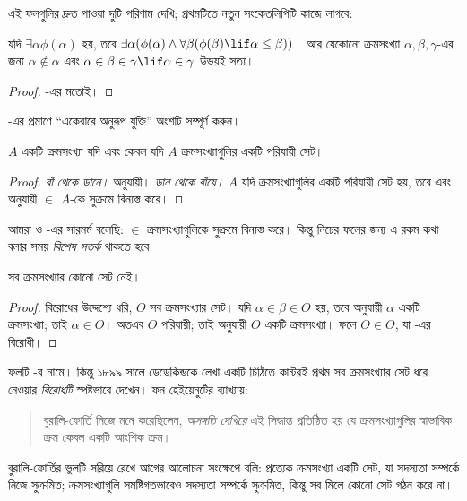 \documentclass[../../../include/open-logic-section]{subfiles}
\begin{document}
এই ফলগুলির দ্রুত পাওয়া দুটি পরিণাম দেখি;
প্রথমটিতে নতুন সংকেতলিপিটি কাজে লাগবে:

\begin{cor}
যদি $\exists \alpha\phi(\alpha)$ হয়, তবে
$\exists \alpha(\phi(\alpha)
\land \forall \beta(\phi(\beta) \lif \alpha \leq \beta))$।
আর যেকোনো ক্রমসংখ্যা $\alpha, \beta, \gamma$-এর
জন্য $\alpha \notin \alpha$ এবং
$\alpha \in \beta \in \gamma \lif \alpha \in \gamma$
উভয়ই সত্য।
\end{cor}

\begin{proof}
-এর মতোই।
\end{proof}

\begin{prob}
-এর প্রমাণে
``একেবারে অনুরূপ যুক্তি'' অংশটি সম্পূর্ণ করুন।
\end{prob}

\begin{cor}
$A$ একটি ক্রমসংখ্যা যদি এবং কেবল যদি $A$
ক্রমসংখ্যাগুলির একটি পরিযায়ী সেট।
\end{cor}

\begin{proof}
\emph{বাঁ থেকে ডানে।} 
অনুযায়ী। \emph{ডান থেকে বাঁয়ে।} $A$ যদি
ক্রমসংখ্যাগুলির একটি পরিযায়ী সেট হয়, তবে
 এবং
 অনুযায়ী $\in$ $A$-কে
সুক্রমে বিন্যস্ত করে।
\end{proof}

আমরা  ও
-এর সারমর্ম বলেছি:
$\in$ ক্রমসংখ্যাগুলিকে সুক্রমে বিন্যস্ত করে।
কিন্তু নিচের ফলের জন্য এ রকম কথা বলার সময়
\emph{বিশেষ সতর্ক} থাকতে হবে:

\begin{thm}[বুরালি-ফোর্তির কূটাভাস]
সব ক্রমসংখ্যার কোনো সেট নেই।
\end{thm}

\begin{proof}
বিরোধের উদ্দেশ্যে ধরি, $O$ সব ক্রমসংখ্যার সেট।
যদি $\alpha \in \beta \in O$ হয়, তবে
 অনুযায়ী $\alpha$ একটি
ক্রমসংখ্যা; তাই $\alpha \in O$। অতএব $O$
পরিযায়ী; তাই  অনুযায়ী
$O$ একটি ক্রমসংখ্যা। ফলে $O \in O$,
যা -এর বিরোধী।
\end{proof}
\noindent
ফলটি \citeauthor{Burali-Forti1897}-র নামে।
কিন্তু ১৮৯৯ সালে ডেডেকিন্ডকে লেখা একটি চিঠিতে
কান্টরই প্রথম সব ক্রমসংখ্যার সেট ধরে নেওয়ার
\emph{বিরোধটি} স্পষ্টভাবে দেখেন। ফন হেইয়েনুর্টের
ব্যাখ্যায়:
\begin{quote}
  বুরালি-ফোর্তি নিজে মনে করেছিলেন,
  \emph{অসঙ্গতি দেখিয়ে} এই সিদ্ধান্ত প্রতিষ্ঠিত হয় যে
  ক্রমসংখ্যাগুলির স্বাভাবিক ক্রম কেবল একটি আংশিক ক্রম।
  \citep[p.~105]{Heijenoort1967}
\end{quote}
বুরালি-ফোর্তির ভুলটি সরিয়ে রেখে আগের আলোচনা
সংক্ষেপে বলি: প্রত্যেক ক্রমসংখ্যা একটি সেট, যা
সদস্যতা সম্পর্কে নিজে সুক্রমিত; ক্রমসংখ্যাগুলি
সমষ্টিগতভাবেও সদস্যতা সম্পর্কে সুক্রমিত, কিন্তু
সব মিলে কোনো সেট গঠন করে না।
\end{document}
